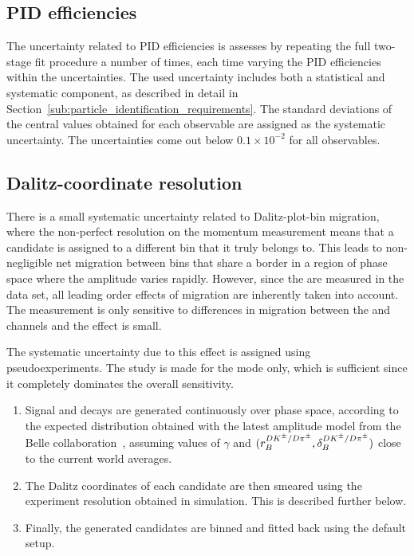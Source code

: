 \subsection{PID efficiencies} %
\label{sub:pid_efficiency_systematic}
The uncertainty related to PID efficiencies is assesses by repeating the full two-stage fit procedure a number of times, each time varying the PID efficiencies within the uncertainties. The used uncertainty includes both a statistical and systematic component, as described in detail in Section~\ref{sub:particle_identification_requirements}. The standard deviations of the central values obtained for each observable are assigned as the systematic uncertainty. The uncertainties come out below $0.1\times 10^{-2}$ for all observables.

\subsection{Dalitz-coordinate resolution} %
\label{sub:dalitz_plot_bin_migration}

There is a small systematic uncertainty related to Dalitz-plot-bin migration, where the non-perfect resolution on the momentum measurement means that a candidate is assigned to a different bin that it truly belongs to. This leads to non-negligible net migration between bins that share a border in a region of phase space where the amplitude varies rapidly. However, since the \Fi are measured in the data set, all leading order effects of migration are inherently taken into account. The measurement is only sensitive to differences in migration between the \DK and \Dpi channels and the effect is small. 

The systematic uncertainty due to this effect is assigned using pseudoexperiments. The study is made for the \DtoKspipi mode only, which is sufficient since it completely dominates the overall sensitivity. 
\begin{enumerate}
    \item Signal \BtoDK and \BtoDpi decays are generated continuously over phase space, according to the expected distribution obtained with the latest amplitude model from the Belle collaboration~\cite{Belle2018}, assuming values of $\gamma$ and $(r_B^{{{D}{{K}^\pm}}/D\pi^\pm},\delta_B^{{{D}{{K}^\pm}}/D\pi^\pm})$ close to the current world averages.
    \item The Dalitz coordinates of each candidate are then smeared using the experiment resolution obtained in simulation. This is described further below.
    \item Finally, the generated candidates are binned and fitted back using the default setup. 
\end{enumerate}

